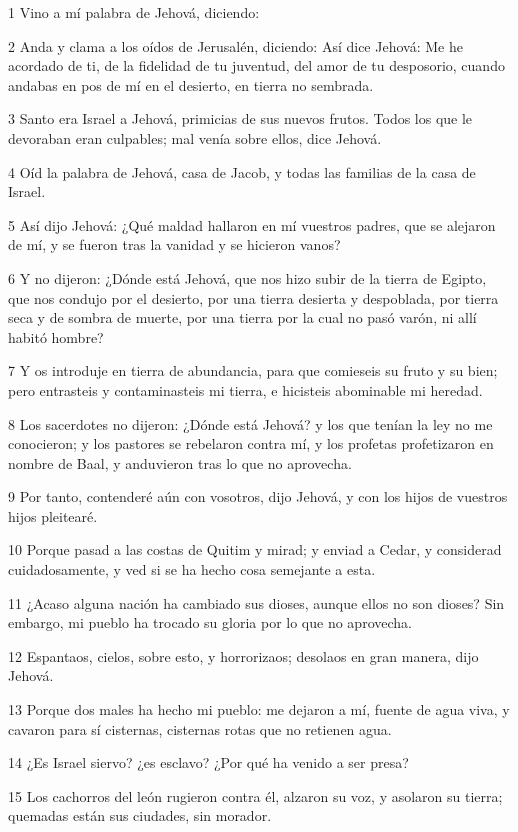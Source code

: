 \par 1 Vino a mí palabra de Jehová, diciendo:
\par 2 Anda y clama a los oídos de Jerusalén, diciendo: Así dice Jehová: Me he acordado de ti, de la fidelidad de tu juventud, del amor de tu desposorio, cuando andabas en pos de mí en el desierto, en tierra no sembrada.
\par 3 Santo era Israel a Jehová, primicias de sus nuevos frutos. Todos los que le devoraban eran culpables; mal venía sobre ellos, dice Jehová.
\par 4 Oíd la palabra de Jehová, casa de Jacob, y todas las familias de la casa de Israel.
\par 5 Así dijo Jehová: ¿Qué maldad hallaron en mí vuestros padres, que se alejaron de mí, y se fueron tras la vanidad y se hicieron vanos?
\par 6 Y no dijeron: ¿Dónde está Jehová, que nos hizo subir de la tierra de Egipto, que nos condujo por el desierto, por una tierra desierta y despoblada, por tierra seca y de sombra de muerte, por una tierra por la cual no pasó varón, ni allí habitó hombre?
\par 7 Y os introduje en tierra de abundancia, para que comieseis su fruto y su bien; pero entrasteis y contaminasteis mi tierra, e hicisteis abominable mi heredad.
\par 8 Los sacerdotes no dijeron: ¿Dónde está Jehová? y los que tenían la ley no me conocieron; y los pastores se rebelaron contra mí, y los profetas profetizaron en nombre de Baal, y anduvieron tras lo que no aprovecha.
\par 9 Por tanto, contenderé aún con vosotros, dijo Jehová, y con los hijos de vuestros hijos pleitearé.
\par 10 Porque pasad a las costas de Quitim y mirad; y enviad a Cedar, y considerad cuidadosamente, y ved si se ha hecho cosa semejante a esta.
\par 11 ¿Acaso alguna nación ha cambiado sus dioses, aunque ellos no son dioses? Sin embargo, mi pueblo ha trocado su gloria por lo que no aprovecha.
\par 12 Espantaos, cielos, sobre esto, y horrorizaos; desolaos en gran manera, dijo Jehová.
\par 13 Porque dos males ha hecho mi pueblo: me dejaron a mí, fuente de agua viva, y cavaron para sí cisternas, cisternas rotas que no retienen agua.
\par 14 ¿Es Israel siervo? ¿es esclavo? ¿Por qué ha venido a ser presa?
\par 15 Los cachorros del león rugieron contra él, alzaron su voz, y asolaron su tierra; quemadas están sus ciudades, sin morador.
